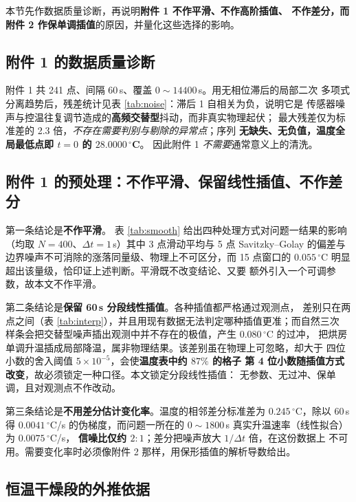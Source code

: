 \documentclass[12pt,a4paper,fontset=none]{ctexart}
\begin{document}
本节先作数据质量诊断，再说明\textbf{附件 1 不作平滑、不作高阶插值、
不作差分，而附件 2 作保单调插值}的原因，并量化这些选择的影响。

\subsection{附件 1 的数据质量诊断}

附件 1 共 241 点、间隔 60\,s、覆盖 $0\sim14400$\,s。用无相位滞后的局部二次
多项式分离趋势后，残差统计见表 \ref{tab:noise}：滞后 1 自相关为负，说明它是
传感器噪声与控温往复调节造成的\textbf{高频交替型}抖动，而非真实物理起伏；
最大残差仅为标准差的 2.3 倍，\emph{不存在需要判别与剔除的异常点}；序列
\textbf{无缺失、无负值，温度全局最低点即 $t=0$ 的 $28.0000\,^\circ$C}。
因此附件 1 \emph{不需要}通常意义上的清洗。

\subsection{附件 1 的预处理：不作平滑、保留线性插值、不作差分}

第一条结论是\textbf{不作平滑}。
表 \ref{tab:smooth} 给出四种处理方式对问题一结果的影响
（均取 $N=400$、$\Delta t=1$\,s）其中 3 点滑动平均与 5 点
Savitzky--Golay 的偏差与边界噪声不可消除的涨落同量级、物理上不可区分，而 15 点窗口的
$0.055\,^\circ$C 明显超出该量级，恰印证上述判断。平滑既不改变结论、又要
额外引入一个可调参数，故本文不作平滑。

第二条结论是\textbf{保留 60\,s 分段线性插值}。各种插值都严格通过观测点，
差别只在两点之间（表 \ref{tab:interp}），并且用现有数据无法判定哪种插值更准；而自然三次
样条会把交替型噪声插出观测中并不存在的极值，产生 $0.080\,^\circ$C 的过冲，
把烘房单调升温插成局部降温，属非物理结果。该差别虽在物理上可忽略，却大于
四位小数的舍入阈值 $5\times10^{-5}$，会使\textbf{温度表中约 $87\%$ 的格子
第 4 位小数随插值方式改变}，故必须锁定一种口径。本文锁定分段线性插值：
无参数、无过冲、保单调，且对观测点不作改动。

第三条结论是\textbf{不用差分估计变化率}。温度的相邻差分标准差为
$0.245\,^\circ$C，除以 60\,s 得 $0.0041\,^\circ$C/s 的伪梯度，而问题一所在的
$0\sim1800$\,s 真实升温速率（线性拟合）为 $0.0075\,^\circ$C/s，
\textbf{信噪比仅约 $2:1$}；差分把噪声放大 $1/\Delta t$ 倍，在这份数据上
不可用。需要变化率时必须像附件 2 那样，用保形插值的解析导数给出。

\subsection{恒温干燥段的外推依据}
\end{document}
